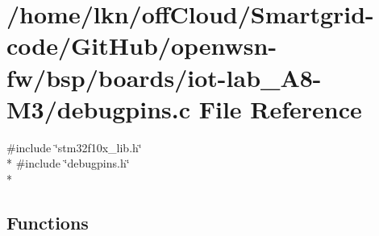\hypertarget{iot-lab___a8-_m3_2debugpins_8c}{}\section{/home/lkn/off\+Cloud/\+Smartgrid-\/code/\+Git\+Hub/openwsn-\/fw/bsp/boards/iot-\/lab\+\_\+\+A8-\/\+M3/debugpins.c File Reference}
\label{iot-lab___a8-_m3_2debugpins_8c}
{\ttfamily \#include \char`\"{}stm32f10x\+\_\+lib.\+h\char`\"{}}\\*
{\ttfamily \#include \char`\"{}debugpins.\+h\char`\"{}}\\*
\subsection*{Functions}

